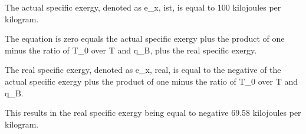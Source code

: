 The actual specific exergy, denoted as e_{x, ist}, is equal to 100 kilojoules per kilogram.

The equation is zero equals the actual specific exergy plus the product of one minus the ratio of T_0 over T and q_B, plus the real specific exergy.

The real specific exergy, denoted as e_{x, real}, is equal to the negative of the actual specific exergy plus the product of one minus the ratio of T_0 over T and q_B.

This results in the real specific exergy being equal to negative 69.58 kilojoules per kilogram.
